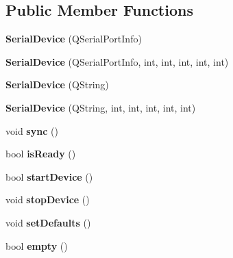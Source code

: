 \subsection*{Public Member Functions}
\begin{DoxyCompactItemize}
\item 
\hypertarget{class_serial_device_aa0b6d87aea8d882096abe85fda113b26}{}\label{class_serial_device_aa0b6d87aea8d882096abe85fda113b26} 
{\bfseries Serial\+Device} (Q\+Serial\+Port\+Info)
\item 
\hypertarget{class_serial_device_acd6d42b1547bef45569e20ba75cd024a}{}\label{class_serial_device_acd6d42b1547bef45569e20ba75cd024a} 
{\bfseries Serial\+Device} (Q\+Serial\+Port\+Info, int, int, int, int, int)
\item 
\hypertarget{class_serial_device_a070f0759c102570004f1c5e1feb31abe}{}\label{class_serial_device_a070f0759c102570004f1c5e1feb31abe} 
{\bfseries Serial\+Device} (Q\+String)
\item 
\hypertarget{class_serial_device_ade7e1d81fe4768ca9f04b12513d7e316}{}\label{class_serial_device_ade7e1d81fe4768ca9f04b12513d7e316} 
{\bfseries Serial\+Device} (Q\+String, int, int, int, int, int)
\item 
\hypertarget{class_serial_device_aef900fa759c9beb4cfb0c72701eb1876}{}\label{class_serial_device_aef900fa759c9beb4cfb0c72701eb1876} 
void {\bfseries sync} ()
\item 
\hypertarget{class_serial_device_aa2435fb76a612b2ebf1a61287deee85d}{}\label{class_serial_device_aa2435fb76a612b2ebf1a61287deee85d} 
bool {\bfseries is\+Ready} ()
\item 
\hypertarget{class_serial_device_a6940a33b7c8f4b83438d16cfa7d8d3ff}{}\label{class_serial_device_a6940a33b7c8f4b83438d16cfa7d8d3ff} 
bool {\bfseries start\+Device} ()
\item 
\hypertarget{class_serial_device_a55f94898f33ab4674c138fa2cb2e75a1}{}\label{class_serial_device_a55f94898f33ab4674c138fa2cb2e75a1} 
void {\bfseries stop\+Device} ()
\item 
\hypertarget{class_serial_device_a08a8a19f8a25c1dc7593c91afc7d55bd}{}\label{class_serial_device_a08a8a19f8a25c1dc7593c91afc7d55bd} 
void {\bfseries set\+Defaults} ()
\item 
\hypertarget{class_serial_device_ae9fc540188704dbdbf3e75d482a92b86}{}\label{class_serial_device_ae9fc540188704dbdbf3e75d482a92b86} 
bool {\bfseries empty} ()
\item 
\hypertarget{class_serial_device_a0e2d400d48238e451de7725e494a0d47}{}\label{class_serial_device_a0e2d400d48238e451de7725e494a0d47} 

\end{DoxyCompactItemize}
